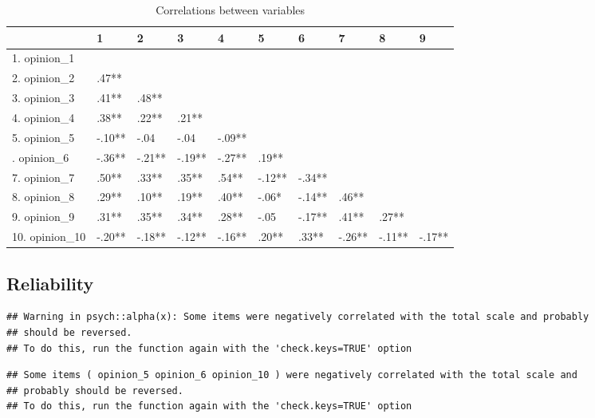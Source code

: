 \documentclass[]{article}
\begin{document}
\begin{table}[H]

\caption{\label{tab:unnamed-chunk-47}Correlations between variables}
\centering
\fontsize{6}{8}\selectfont
\begin{tabular}[t]{llllllllll}
\toprule
  & 1 & 2 & 3 & 4 & 5 & 6 & 7 & 8 & 9\\
\midrule
1. opinion\_1 &  &  &  &  &  &  &  &  & \\
2. opinion\_2 & .47** &  &  &  &  &  &  &  & \\
3. opinion\_3 & .41** & .48** &  &  &  &  &  &  & \\
4. opinion\_4 & .38** & .22** & .21** &  &  &  &  &  & \\
5. opinion\_5 & -.10** & -.04 & -.04 & -.09** &  &  &  &  & \\
\addlinespace
6. opinion\_6 & -.36** & -.21** & -.19** & -.27** & .19** &  &  &  & \\
7. opinion\_7 & .50** & .33** & .35** & .54** & -.12** & -.34** &  &  & \\
8. opinion\_8 & .29** & .10** & .19** & .40** & -.06* & -.14** & .46** &  & \\
9. opinion\_9 & .31** & .35** & .34** & .28** & -.05 & -.17** & .41** & .27** & \\
10. opinion\_10 & -.20** & -.18** & -.12** & -.16** & .20** & .33** & -.26** & -.11** & -.17**\\
\bottomrule
\end{tabular}
\end{table}

\hypertarget{reliability-8}{%
\subsection{Reliability}\label{reliability-8}}

\begin{verbatim}
## Warning in psych::alpha(x): Some items were negatively correlated with the total scale and probably 
## should be reversed.  
## To do this, run the function again with the 'check.keys=TRUE' option
\end{verbatim}

\begin{verbatim}
## Some items ( opinion_5 opinion_6 opinion_10 ) were negatively correlated with the total scale and 
## probably should be reversed.  
## To do this, run the function again with the 'check.keys=TRUE' option
\end{verbatim}
\end{document}
